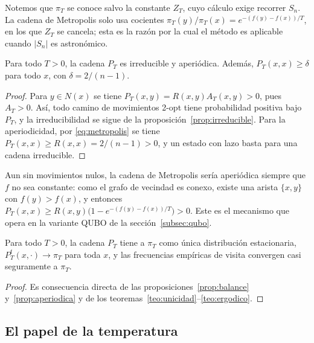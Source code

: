 Notemos que \(\pi_T\) se conoce salvo la constante \(Z_T\), cuyo
cálculo exige recorrer \(S_n\). La cadena de Metropolis solo usa
cocientes \(\pi_T(y)/\pi_T(x)=e^{-(f(y)-f(x))/T}\), en los que \(Z_T\)
se cancela; esta es la razón por la cual el método es aplicable cuando
\(|S_n|\) es astronómico.

\begin{proposicion}
\label{prop:aperiodica}
Para todo \(T>0\), la cadena \(P_T\) es irreducible y aperiódica.
Además, \(P_T(x,x)\ge \delta\) para todo \(x\), con
\(\delta=2/(n-1)\).
\end{proposicion}

\begin{proof}
Para \(y\in N(x)\) se tiene \(P_T(x,y)=R(x,y)A_T(x,y)>0\), pues
\(A_T>0\). Así, todo camino de movimientos 2-opt tiene probabilidad
positiva bajo \(P_T\), y la irreducibilidad se sigue de la
proposición~\ref{prop:irreducible}. Para la aperiodicidad, por
\eqref{eq:metropolis} se tiene \(P_T(x,x)\ge R(x,x)=2/(n-1)>0\), y un
estado con lazo basta para una cadena irreducible.
\end{proof}

\begin{observacion}
\label{obs:rechazos}
Aun sin movimientos nulos, la cadena de Metropolis sería aperiódica
siempre que \(f\) no sea constante: como el grafo de vecindad es conexo,
existe una arista \(\{x,y\}\) con \(f(y)>f(x)\), y entonces
\(P_T(x,x)\ge R(x,y)\bigl(1-e^{-(f(y)-f(x))/T}\bigr)>0\). Este es el
mecanismo que opera en la variante QUBO de la
sección~\ref{subsec:qubo}.
\end{observacion}

\begin{corolario}
\label{cor:metropolis}
Para todo \(T>0\), la cadena \(P_T\) tiene a
\(\pi_T\) como única distribución estacionaria,
\(P_T^t(x,\cdot)\to\pi_T\) para toda \(x\), y las frecuencias empíricas
de visita convergen casi seguramente a \(\pi_T\).
\end{corolario}

\begin{proof}
Es consecuencia directa de las proposiciones~\ref{prop:balance}
y~\ref{prop:aperiodica} y de los
teoremas~\ref{teo:unicidad}--\ref{teo:ergodico}.
\end{proof}

\subsection{El papel de la temperatura}
\label{subsec:temperatura}

